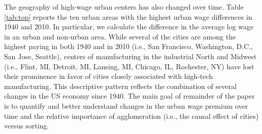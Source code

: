 \documentclass[12pt]{article}
\makeatletter
\let\@@input
\makeatother
\begin{document}
\begin{table}[t]
  \caption{Summary Statistics}
  \label{tab:summ}
  \renewcommand{\arraystretch}{1.25}

\end{table}

The geography of high-wage urban centers has also changed over time.
Table \ref{tab:top} reports the ten urban areas with the highest urban wage differences in 1940 and 2010.
In particular, we calculate the difference in the average log wage in an urban and non-urban area.
While several of the cities are among the highest paying in both 1940 and in 2010 (i.e., San Francisco, Washington, D.C., San Jose, Seattle), centers of manufacturing in the industrial North and Midwest (i.e., Flint, MI, Detroit, MI, Lansing, MI, Chicago, IL, Rochester, NY) have lost their prominence in favor of cities closely associated with high-tech manufacturing.
This descriptive pattern reflects the combination of several changes in the US economy since 1940.
The main goal of remainder of the paper is to quantify and better understand changes in the urban wage premium over time and the relative importance of agglomeration (i.e., the causal effect of cities) versus sorting. 
\end{document}
